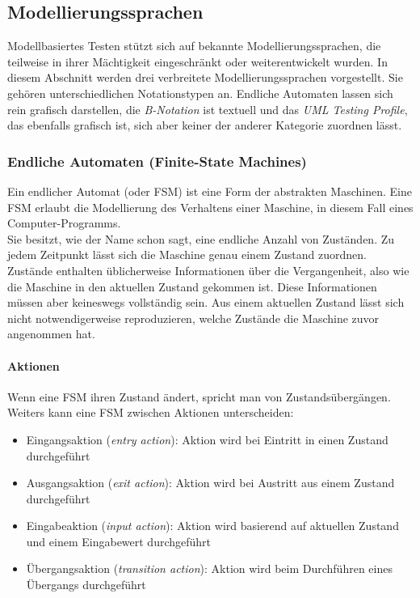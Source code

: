 \subsection{Modellierungssprachen}
\label{sec:notations}

Modellbasiertes Testen stützt sich auf bekannte Modellierungssprachen, die teilweise in ihrer Mächtigkeit eingeschränkt oder weiterentwickelt wurden. In diesem Abschnitt werden drei verbreitete Modellierungssprachen vorgestellt. Sie gehören unterschiedlichen Notationstypen an. Endliche Automaten lassen sich rein grafisch darstellen, die \textit{B-Notation} ist textuell und das \textit{UML Testing Profile}, das ebenfalls grafisch ist, sich aber keiner der anderer Kategorie zuordnen lässt.

\subsubsection{Endliche Automaten (Finite-State Machines)}
\label{sec:fsm}
Ein endlicher Automat (oder \Gls{FSM}) ist eine Form der abstrakten Maschinen. Eine \Gls{FSM} erlaubt die Modellierung des Verhaltens einer Maschine, in diesem Fall eines Computer-Programms. \cite{wagner_modeling_2006}\\
Sie besitzt, wie der Name schon sagt, eine endliche Anzahl von Zuständen. Zu jedem Zeitpunkt lässt sich die Maschine genau einem Zustand zuordnen. Zustände enthalten üblicherweise Informationen über die Vergangenheit, also wie die Maschine in den aktuellen Zustand gekommen ist. Diese Informationen müssen aber keineswegs vollständig sein. Aus einem aktuellen Zustand lässt sich nicht notwendigerweise reproduzieren, welche Zustände die Maschine zuvor angenommen hat.\\

\paragraph{Aktionen}
Wenn eine \Gls{FSM} ihren Zustand ändert, spricht man von Zustandsübergängen. Weiters kann eine \Gls{FSM} zwischen Aktionen unterscheiden:
\begin{itemize}
\item Eingangsaktion (\textit{entry action}): Aktion wird bei Eintritt in einen Zustand durchgeführt
\item Ausgangsaktion (\textit{exit action}): Aktion wird bei Austritt aus einem Zustand durchgeführt
\item Eingabeaktion (\textit{input action}): Aktion wird basierend auf aktuellen Zustand und einem Eingabewert durchgeführt
\item Übergangsaktion (\textit{transition action}): Aktion wird beim Durchführen eines Übergangs durchgeführt
\end{itemize}

